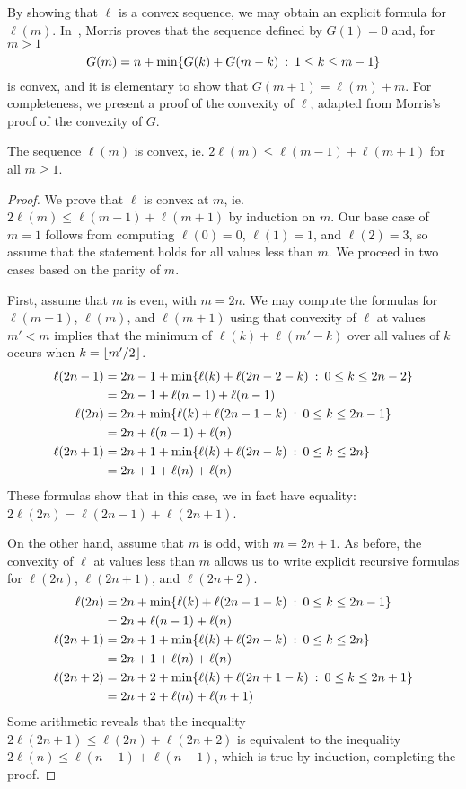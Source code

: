 By showing that $\ell$ is a convex sequence, we may obtain an explicit formula for $\ell(m)$. In~\cite{morris:some-theorems-on:}, Morris proves that the sequence defined by $G(1) = 0$ and, for $m > 1$ 
\[
	G(m) 
	= 
	n + \min\{G(k) + G(m-k) \::\: 1 \le k \le m-1\}
\]
is convex, and it is elementary to show that $G(m+1) = \ell(m) + m$. For completeness, we present a proof of the convexity of $\ell$, adapted from Morris's proof of the convexity of $G$.

\begin{proposition}
\label{prop-ell-convex}
	The sequence $\ell(m)$ is convex, ie. $2\ell(m) \le \ell(m-1) + \ell(m+1)$ for all $m \ge 1$.
\end{proposition}
\begin{proof}
	We prove that $\ell$ is convex at $m$, ie. $2\ell(m) \le \ell(m-1) + \ell(m+1)$ by induction on $m$. Our base case of $m = 1$ follows from computing $\ell(0) = 0$, $\ell(1) = 1$, and $\ell(2) = 3$, so assume that the statement holds for all values less than $m$. We proceed in two cases based on the parity of $m$.

	First, assume that $m$ is even, with $m = 2n$. We may compute the formulas for $\ell(m-1)$, $\ell(m)$, and $\ell(m+1)$ using that convexity of $\ell$ at values $m' < m$ implies that the minimum of $\ell(k) + \ell(m'-k)$ over all values of $k$ occurs when $k = {\left\lfloor{m'/2}\right\rfloor}$.
	\begin{align*}
		\ell(2n-1)
			&= 2n-1 + \min\{\ell(k) + \ell(2n-2-k) \::\: 0 \le k \le 2n-2\} \\
			&= 2n-1 + \ell(n-1) + \ell(n-1) \\
		\ell(2n)
			&= 2n   + \min\{\ell(k) + \ell(2n-1-k) \::\: 0 \le k \le 2n-1\} \\
			&= 2n   + \ell(n-1) + \ell(n) \\
		\ell(2n+1)
			&= 2n+1 + \min\{\ell(k) + \ell(2n  -k) \::\: 0 \le k \le 2n  \} \\
			&= 2n+1 + \ell(n) + \ell(n)
	\end{align*}
	These formulas show that in this case, we in fact have equality: $2\ell(2n) = \ell(2n-1) + \ell(2n+1)$.

	On the other hand, assume that $m$ is odd, with $m = 2n+1$. As before, the convexity of $\ell$ at values less than $m$ allows us to write explicit recursive formulas for $\ell(2n)$, $\ell(2n+1)$, and $\ell(2n+2)$.
	\begin{align*}
		\ell(2n)
			&= 2n   + \min\{\ell(k) + \ell(2n-1-k) \::\: 0 \le k \le 2n-1\} \\
			&= 2n   + \ell(n-1) + \ell(n) \\
		\ell(2n+1)
			&= 2n+1 + \min\{\ell(k) + \ell(2n  -k) \::\: 0 \le k \le 2n  \} \\
			&= 2n+1 + \ell(n) + \ell(n) \\
		\ell(2n+2)
			&= 2n+2 + \min\{\ell(k) + \ell(2n+1-k) \::\: 0 \le k \le 2n+1\} \\
			&= 2n+2 + \ell(n) + \ell(n+1)
	\end{align*}
	Some arithmetic reveals that the inequality $2 \ell(2n+1) \le \ell(2n) + \ell(2n+2)$ is equivalent to the inequality $2\ell(n) \le \ell(n-1) + \ell(n+1)$, which is true by induction, completing the proof.
\end{proof}

